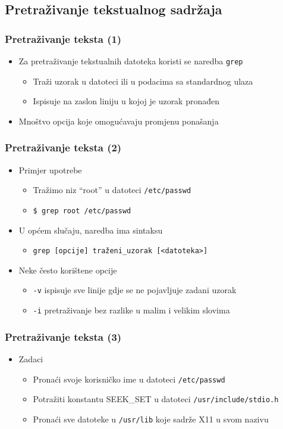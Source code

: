 \documentclass{beamer}
\newcommand{\shell}[1]{\texttt{#1}}
\begin{document}
\subsection{Pretraživanje tekstualnog sadržaja}
\begin{frame}[t]
\frametitle{Pretraživanje teksta (1)}
\begin{itemize}
  \item Za pretraživanje tekstualnih datoteka koristi se naredba 
        \shell{grep}
  \begin{itemize}
    \item Traži uzorak u datoteci ili u podacima sa standardnog ulaza
    \item Ispisuje na zaslon liniju u kojoj je uzorak pronađen
  \end{itemize}
  \item Mnoštvo opcija koje omogućavaju promjenu ponašanja
\end{itemize}
\end{frame}

\begin{frame}[t]
\frametitle{Pretraživanje teksta (2)}
\begin{itemize}
  \item Primjer upotrebe
  \begin{itemize}
    \item Tražimo niz “root” u datoteci \shell{/etc/passwd}
    \item[] \shell{\$ grep root /etc/passwd}
  \end{itemize}
  \item U općem slučaju, naredba ima sintaksu
  \begin{itemize}
    \item[] \shell{grep [opcije] traženi\_uzorak [<datoteka>]}
  \end{itemize}
  \item Neke često korištene opcije
  \begin{itemize}
    \item \shell{-v} ispisuje sve linije gdje se ne pojavljuje zadani 
          uzorak
    \item \shell{-i} pretraživanje bez razlike u malim i velikim slovima
  \end{itemize}
\end{itemize}
\end{frame}

\begin{frame}[t]
\frametitle{Pretraživanje teksta (3)}
\begin{itemize}
  \item Zadaci
  \begin{itemize}
    \item Pronaći svoje korisničko ime u datoteci \shell{/etc/passwd}
    \item Potražiti konstantu SEEK\_SET u datoteci 
          \shell{/usr/include/stdio.h}
    \item Pronaći sve datoteke u \shell{/usr/lib} koje sadrže X11 u svom 
          nazivu
  \end{itemize}
\end{itemize}
\end{frame}
\end{document}
